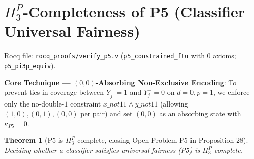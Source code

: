 \documentclass[11pt,a4paper]{article}
\newtheorem{theorem}{Theorem}[section]
\newcommand{\code}[1]{\texttt{\small #1}}
\begin{document}
\section{\texorpdfstring{$\Pi_3^P$}{Pi\_3\^{}P}-Completeness of P5 (Classifier Universal Fairness)}
Rocq file: \code{rocq\_proofs/verify\_p5.v} (\code{p5\_constrained\_ftu} with 0 axioms; \code{p5\_pi3p\_equiv}).

\textbf{Core Technique — $(0,0)$-Absorbing Non-Exclusive Encoding}: To prevent ties in coverage between $Y_j^+=1$ and $Y_j^-=0$ on $d=0,p=1$, we enforce only the no-double-$1$ constraint $x\_not11 \land y\_not11$ (allowing $(1,0),(0,1),(0,0)$ per pair) and set $(0,0)$ as an absorbing state with $\kappa_{P5}=0$.

\begin{theorem}[P5 is $\Pi_3^P$-complete, closing Open Problem P5 in Proposition 28]
Deciding whether a classifier satisfies universal fairness (P5) is $\Pi_3^P$-complete.
\end{theorem}
\end{document}
